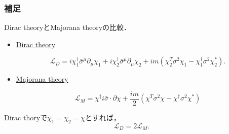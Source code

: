 \documentclass[pdflatex,unicode,ja=standard,12pt]{beamer}
\begin{document}
\begin{frame}[noframenumbering]

  \frametitle{補足 \subsecname}
  \thispagestyle{empty}  

  Dirac theoryとMajorana theoryの比較．

  \begin{itemize}

    \item 

    \uline{Dirac theory}

    \begin{equation}
      \mathcal{L}_{D}
      =
      i\chi_1^{\dag}\bar{\sigma}^{\mu}\partial_{\mu}\chi_1
      +
      i\chi_2^{\dag}\bar{\sigma}^{\mu}\partial_{\mu}\chi_2
      +
      im(\chi_{2}^{T}\sigma^2\chi_1-\chi_1^{\dag}\sigma^2\chi_2^{\ast})
      .
    \end{equation}

    \item 

    \uline{Majorana theory}

    \begin{equation}    
      \mathcal{L}_{M}
      =
      \chi^{\dag}i\bar{\sigma}\cdot\partial\chi
      +
      \frac{im}{2}(\chi^{T}\sigma^{2}\chi-\chi^{\dag}\sigma^2\chi^{*})
    \end{equation}

  \end{itemize}

  \vspace{10pt}

  Dirac thoryで$\chi_1=\chi_2=\chi$とすれば，
  \begin{equation}
    \mathcal{L}_{D}
    =
    2\mathcal{L}_{M}
    .
  \end{equation}


\end{frame}
\end{document}
